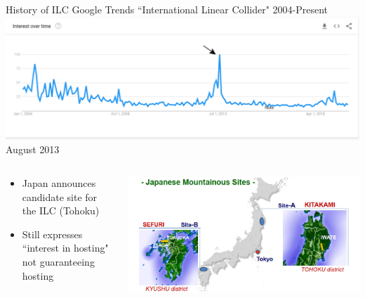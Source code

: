 \documentclass[10pt]{beamer}
\begin{document}
\begin{frame}{History of ILC}
Google Trends ``International Linear Collider" 2004-Present
\includegraphics[scale=0.25]{timeline4.png}\\
August 2013 
\begin{columns}
\begin{column}{0.5\textwidth}
\begin{itemize}
\scriptsize
\item Japan announces candidate site for the ILC (Tohoku)
\item Still expresses ``interest in hosting" not guaranteeing hosting
\end{itemize}
\end{column}
\begin{column}{0.5\textwidth}
\includegraphics[scale=0.2]{japanese_sites.jpg}\\
\end{column}
\end{columns}

\end{frame}
\end{document}
